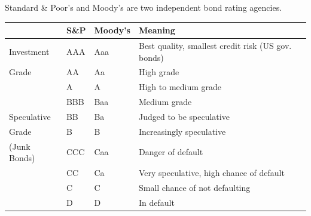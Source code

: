 \noindent\begin{minipage}{\textwidth}
Standard \& Poor's and Moody's are two independent bond rating agencies.
\begin{center}
\begin{tabular}{@{}llll@{}}
    \toprule
    & S\&P & Moody's & Meaning\\
    \midrule
    Investment & AAA & Aaa & Best quality, smallest credit risk (US gov. bonds)\\
    Grade & AA & Aa & High grade\\
    & A & A & High to medium grade\\
    & BBB & Baa & Medium grade\\
    \midrule
    Speculative & BB & Ba & Judged to be speculative\\
    Grade & B & B & Increasingly speculative\\
    (Junk Bonds) & CCC & Caa & Danger of default\\
    & CC & Ca & Very speculative, high chance of default\\
    & C & C & Small chance of not defaulting\\
    & D & D & In default\\
    \bottomrule
\end{tabular}
\end{center}
\end{minipage}
\par
